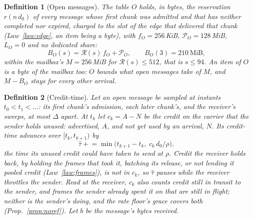 \documentclass[journal]{IEEEtran}
\newtheorem{definition}{Definition}
\newcommand{\Rg}{\mathcal{R}}
\newcommand{\Pool}{\mathcal{P}}
\begin{document}
\begin{definition}[Open messages]\label{def:open}
The table $O$ holds, in bytes, the reservation $r(n\,d_0)$ of every message whose first chunk
was admitted and that has neither completed nor expired, charged to the slot of the edge that
delivered that chunk (Law~\ref{law:edge}, an item being a byte), with
$f_O=256$\,KiB, $\Pool_O=128$\,MiB, $L_O=0$ and no dedicated share:
\[
B_O(s)=\Rg(s)\,f_O+\Pool_O,\qquad B_O(3)=210\ \mathrm{MiB},
\]
within the mailbox's $M=256$\,MiB for $\Rg(s)\le512$, that is $s\le94$.  An item of $O$ is
a byte of the mailbox too: $O$ bounds what open messages take of $M$, and $M-B_O$ stays for
every other arrival.
\end{definition}

\begin{definition}[Credit-time]\label{def:credittime}
Let an open message be sampled at instants $t_0<t_1<\dots$: its first chunk's admission, each
later chunk's, and the receiver's sweeps, at most $\Delta$ apart.  At $t_k$ let $c_k=A-N$ be the
credit on the carrier that the sender holds unused: advertised, $A$, and not yet used by an
arrival, $N$.  Its credit-time advances over $[t_k,t_{k+1})$ by
\[
\hat\tau\mathrel{+}=\min\!\bigl(t_{k+1}-t_k,\;c_k\,d_0/\rho\bigr),
\]
the time its unused credit could have taken to send at $\rho$.  Credit the receiver holds back,
by holding the frames that took it, batching its release, or not lending it pooled credit
(Law~\ref{law:frames}), is not in $c_k$, so $\hat\tau$ pauses while the receiver throttles the
sender.
Read at the receiver, $c_k$ also counts credit still in transit to the sender, and frames the
sender already spent it on that are still in flight; neither is the sender's doing, and the rate
floor's grace covers both (Prop.~\ref{prop:noref}).
Let $b$ be the message's bytes received.
\end{definition}
\end{document}
